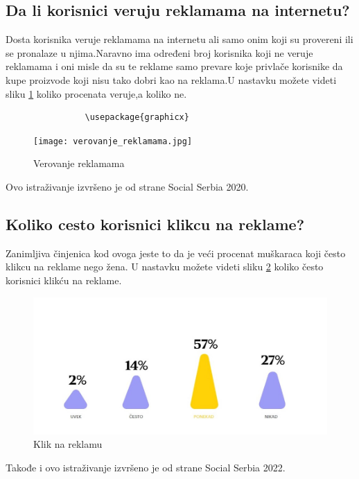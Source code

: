 \documentclass[a4paper]{article}
\begin{document}
{{			\subsection{Da li korisnici veruju reklamama na internetu?}
			\label{subsec:veovanje_reklamama}
			Dosta korisnika veruje reklamama na internetu ali samo onim koji su provereni ili se pronalaze u njima.Naravno ima određeni broj korisnika koji ne veruje reklamama i oni misle da su te reklame samo prevare koje privlače korisnike da kupe proizvode koji nisu tako dobri kao na reklama.U nastavku možete videti sliku \ref{fig:verovanje_reklamama} koliko procenata veruje,a koliko ne.
			\begin{verbatim}
				\usepackage{graphicx}
			\end{verbatim}
			
			\begin{figure}[h!]
				\begin{center}
					\texttt{[image: verovanje\_reklamama.jpg]}
				\end{center}
				\caption{Verovanje reklamama}
				\label{fig:verovanje_reklamama}
			\end{figure}
			Ovo istraživanje izvršeno je od strane Social Serbia 2020.
			\subsection{Koliko cesto korisnici klikcu na reklame?}
			\label{subsec:klik_na_reklamu}
			Zanimljiva činjenica kod ovoga jeste to da je veći procenat muškaraca koji često klikcu na reklame nego žena. U nastavku možete videti sliku \ref{fig:klik_na_reklamu} koliko često korisnici klikću na reklame.
			
			
			\begin{figure}[h!]
				\begin{center}
					\includegraphics[scale=0.55]{klik_na_reklamu.jpg}
				\end{center}
				\caption{Klik na reklamu}
				\label{fig:klik_na_reklamu}
			\end{figure}
			Takođe i ovo istraživanje izvršeno je od strane Social Serbia 2022.
}}
\end{document}
